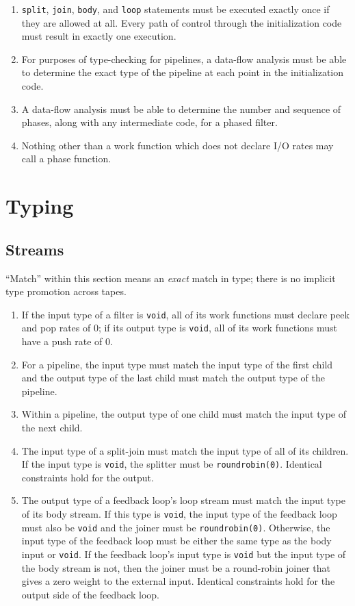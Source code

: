 \documentclass[11pt]{article}
\begin{document}
\begin{enumerate}
\item \lstinline|split|, \lstinline|join|, \lstinline|body|, and
  \lstinline|loop| statements must be executed exactly once if they
  are allowed at all.  Every path of control through the
  initialization code must result in exactly one execution.
\item For purposes of type-checking for pipelines, a data-flow
  analysis must be able to determine the exact type of the pipeline at
  each point in the initialization code.
\item A data-flow analysis must be able to determine the number and
  sequence of phases, along with any intermediate code, for a phased
  filter.
\item Nothing other than a work function which does not declare I/O
  rates may call a phase function.
\end{enumerate}

\section{Typing}

\subsection{Streams}

``Match'' within this section means an \emph{exact} match in type;
there is no implicit type promotion across tapes.

\begin{enumerate}
\item If the input type of a filter is \lstinline|void|, all of its
  work functions must declare peek and pop rates of 0; if its output
  type is \lstinline|void|, all of its work functions must have a push
  rate of 0.
\item For a pipeline, the input type must match the input type of the
  first child and the output type of the last child must match the
  output type of the pipeline.
\item Within a pipeline, the output type of one child must match the
  input type of the next child.
\item The input type of a split-join must match the input type of all
  of its children.  If the input type is \lstinline|void|, the
  splitter must be \lstinline|roundrobin(0)|.  Identical constraints
  hold for the output.
\item The output type of a feedback loop's loop stream must match the
  input type of its body stream.  If this type is \lstinline|void|,
  the input type of the feedback loop must also be \lstinline|void|
  and the joiner must be \lstinline|roundrobin(0)|.  Otherwise, the
  input type of the feedback loop must be either the same type as the
  body input or \lstinline|void|.  If the feedback loop's input type
  is \lstinline|void| but the input type of the body stream is not,
  then the joiner must be a round-robin joiner that gives a zero
  weight to the external input.  Identical constraints hold for the
  output side of the feedback loop.
\end{enumerate}
\end{document}
